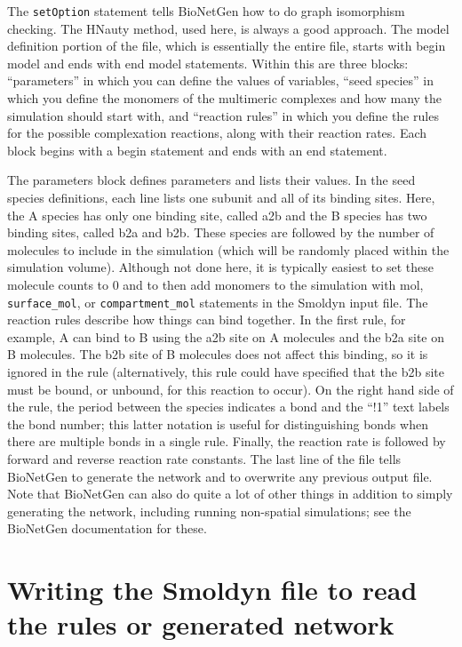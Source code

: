 \documentclass {book}
\newcommand {\ttt} {\texttt}
\begin{document}
The \ttt{setOption} statement tells BioNetGen how to do graph isomorphism checking. The HNauty method, used here, is always a good approach. The model definition portion of the file, which is essentially the entire file, starts with begin model and ends with end model statements. Within this are three blocks: ``parameters'' in which you can define the values of variables, ``seed species'' in which you define the monomers of the multimeric complexes and how many the simulation should start with, and ``reaction rules'' in which you define the rules for the possible complexation reactions, along with their reaction rates. Each block begins with a begin statement and ends with an end statement.

The parameters block defines parameters and lists their values. In the seed species definitions, each line lists one subunit and all of its binding sites. Here, the A species has only one binding site, called a2b and the B species has two binding sites, called b2a and b2b. These species are followed by the number of molecules to include in the simulation (which will be randomly placed within the simulation volume). Although not done here, it is typically easiest to set these molecule counts to 0 and to then add monomers to the simulation with mol, \ttt{surface\_mol}, or \ttt{compartment\_mol} statements in the Smoldyn input file. The reaction rules describe how things can bind together. In the first rule, for example, A can bind to B using the a2b site on A molecules and the b2a site on B molecules. The b2b site of B molecules does not affect this binding, so it is ignored in the rule (alternatively, this rule could have specified that the b2b site must be bound, or unbound, for this reaction to occur). On the right hand side of the rule, the period between the species indicates a bond and the ``!1'' text labels the bond number; this latter notation is useful for distinguishing bonds when there are multiple bonds in a single rule. Finally, the reaction rate is followed by forward and reverse reaction rate constants. The last line of the file tells BioNetGen to generate the network and to overwrite any previous output file. Note that BioNetGen can also do quite a lot of other things in addition to simply generating the network, including running non-spatial simulations; see the BioNetGen documentation for these.

\section{Writing the Smoldyn file to read the rules or generated network}
\end{document}
